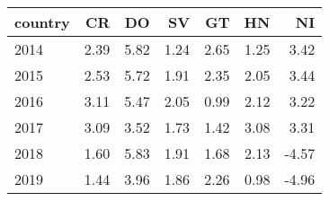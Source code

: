 \begin{tabular}{lrrrrrr}
\toprule
country &    CR &    DO &    SV &    GT &    HN &    NI \\
\midrule
2014 &  2.39 &  5.82 &  1.24 &  2.65 &  1.25 &  3.42 \\
2015 &  2.53 &  5.72 &  1.91 &  2.35 &  2.05 &  3.44 \\
2016 &  3.11 &  5.47 &  2.05 &  0.99 &  2.12 &  3.22 \\
2017 &  3.09 &  3.52 &  1.73 &  1.42 &  3.08 &  3.31 \\
2018 &  1.60 &  5.83 &  1.91 &  1.68 &  2.13 & -4.57 \\
2019 &  1.44 &  3.96 &  1.86 &  2.26 &  0.98 & -4.96 \\
\bottomrule
\end{tabular}
